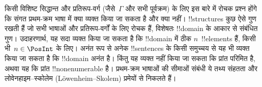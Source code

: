 \documentclass[../../../include/open-logic-section]{subfiles}
\begin{document}
किसी विशिष्ट सिद्धान्त और प्रतिरूप-वर्ग (जैसे~$\Gamma$ और सभी पूर्वक्रम) के
लिए इस बारे में रोचक प्रश्न होंगे कि संगत प्रथम-क्रम भाषा में क्या व्यक्त
किया जा सकता है और क्या नहीं। !!{structure}s कुछ ऐसे गुण रखती हैं जो सभी
भाषाओं और प्रतिरूप-वर्गों के लिए रोचक हैं, विशेषतः !!{domain} के आकार से
संबंधित गुण। उदाहरणार्थ, यह सदा व्यक्त किया जा सकता है कि !!{domain} में ठीक
$n$~!!{element}s हैं, किसी भी~$n \in \PosInt$ के लिए। अनंत रूप से अनेक
!!{sentence}s के किसी समुच्चय से यह भी व्यक्त किया जा सकता है कि !!{domain}
अनंत है। किंतु यह व्यक्त नहीं किया जा सकता कि प्रांत परिमित है, अथवा यह कि
प्रांत !!{nonenumerable} है। प्रथम-क्रम भाषाओं की सीमाओं संबंधी ये तथ्य
संहतता और लोवेनहाइम--स्कोलेम (L\"owenheim--Skolem) प्रमेयों से निकलते हैं।
\end{document}
